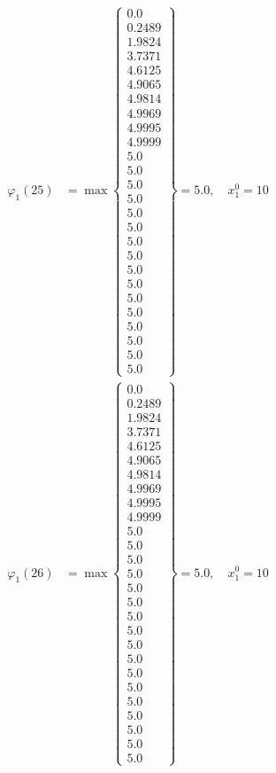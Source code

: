 \documentclass{article}
\begin{document}
\begin{align*}
\varphi_{1}(25) &= \max \left\{ \begin{array}{c}
0.0 \\
 0.2489 \\
 1.9824 \\
 3.7371 \\
 4.6125 \\
 4.9065 \\
 4.9814 \\
 4.9969 \\
 4.9995 \\
 4.9999 \\
 5.0 \\
 5.0 \\
 5.0 \\
 5.0 \\
 5.0 \\
 5.0 \\
 5.0 \\
 5.0 \\
 5.0 \\
 5.0 \\
 5.0 \\
 5.0 \\
 5.0 \\
 5.0 \\
 5.0 \\
 5.0
\end{array} \right\}=5.0, \quad x_{1}^0=10\\
  
\varphi_{1}(26) &= \max \left\{ \begin{array}{c}
0.0 \\
 0.2489 \\
 1.9824 \\
 3.7371 \\
 4.6125 \\
 4.9065 \\
 4.9814 \\
 4.9969 \\
 4.9995 \\
 4.9999 \\
 5.0 \\
 5.0 \\
 5.0 \\
 5.0 \\
 5.0 \\
 5.0 \\
 5.0 \\
 5.0 \\
 5.0 \\
 5.0 \\
 5.0 \\
 5.0 \\
 5.0 \\
 5.0 \\
 5.0 \\
 5.0 \\
 5.0
\end{array} \right\}=5.0, \quad x_{1}^0=10\\
  

\end{align*}
\end{document}
